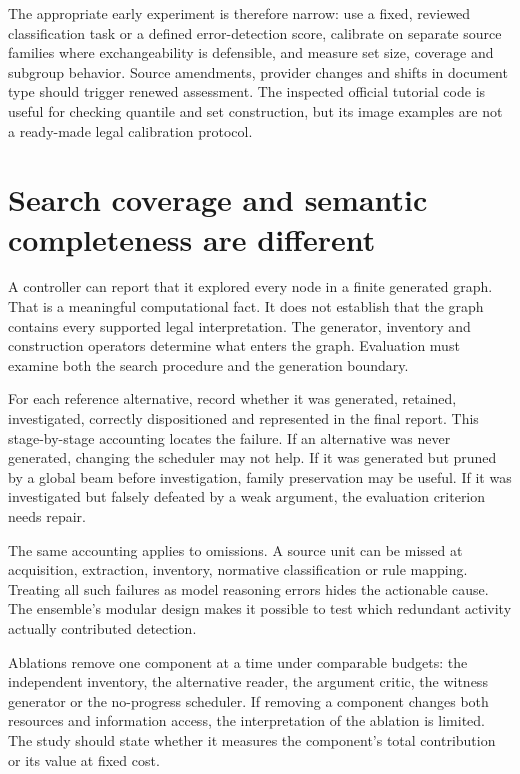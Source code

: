 \documentclass[12pt,a4paper,oneside,openany]{book}
\begin{document}
The appropriate early experiment is therefore narrow: use a fixed, reviewed
classification task or a defined error-detection score, calibrate on separate
source families where exchangeability is defensible, and measure set size,
coverage and subgroup behavior. Source amendments, provider changes and shifts in
document type should trigger renewed assessment. The inspected official tutorial
code is useful for checking quantile and set construction, but its image examples
are not a ready-made legal calibration protocol.

\section{Search coverage and semantic completeness are different}

A controller can report that it explored every node in a finite generated graph.
That is a meaningful computational fact. It does not establish that the graph
contains every supported legal interpretation. The generator, inventory and
construction operators determine what enters the graph. Evaluation must examine
both the search procedure and the generation boundary.

For each reference alternative, record whether it was generated, retained,
investigated, correctly dispositioned and represented in the final report. This
stage-by-stage accounting locates the failure. If an alternative was never
generated, changing the scheduler may not help. If it was generated but pruned by
a global beam before investigation, family preservation may be useful. If it was
investigated but falsely defeated by a weak argument, the evaluation criterion
needs repair.

The same accounting applies to omissions. A source unit can be missed at
acquisition, extraction, inventory, normative classification or rule mapping.
Treating all such failures as model reasoning errors hides the actionable cause.
The ensemble's modular design makes it possible to test which redundant activity
actually contributed detection.

Ablations remove one component at a time under comparable budgets: the independent
inventory, the alternative reader, the argument critic, the witness generator or
the no-progress scheduler. If removing a component changes both resources and
information access, the interpretation of the ablation is limited. The study
should state whether it measures the component's total contribution or its value
at fixed cost.
\end{document}

